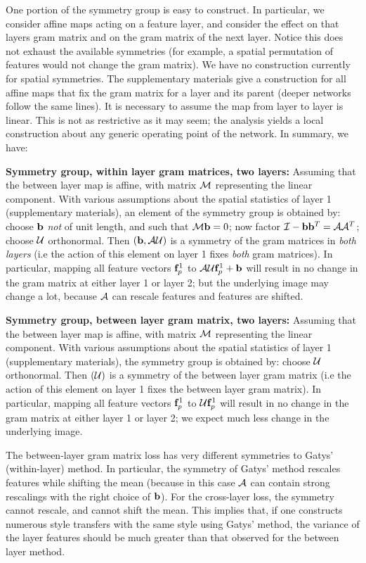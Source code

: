 \documentclass[runningheads]{llncs}
\newcommand{\vect}[1]{{\bf {#1}}}
\newcommand{\matx}[1]{{\cal {#1}}}
\begin{document}
One portion of the symmetry group is easy to construct.  In particular, we consider affine maps acting on a feature layer, and consider the effect on that layers gram matrix and
on the gram matrix of the next layer.  Notice this does not exhaust the available symmetries (for example, a spatial permutation of features
would not change the gram matrix).  We have no construction currently for spatial symmetries.
The supplementary materials give a construction for all affine maps that fix the gram matrix for a layer and its parent
(deeper networks follow the same lines).  It is necessary to assume the map from layer to layer is linear.  This is not
as restrictive as it may seem; the analysis yields a local construction about any generic operating point of the
network.  In summary, we have:

{\bf Symmetry group, within layer gram matrices, two layers:}
Assuming that the between layer map is affine, with matrix $\matx{M}$
representing the linear component.  With various assumptions about the
spatial statistics of layer 1 (supplementary materials), an element of the symmetry
group is obtained by:  choose $\vect{b}$ {\em not} of unit length, and
such that $\matx{M}\vect{b}=0$; now factor
$\matx{I}-\vect{b}\vect{b}^T=\matx{A}\matx{A}^T$; choose $\matx{U}$
orthonormal.  Then $(\vect{b}, \matx{A}\matx{U})$ is a symmetry of the
gram matrices in {\em both layers} (i.e the action of this element on
layer 1 fixes {\em both} gram matrices).   In particular, mapping all feature vectors $\vect{f}_p^1$ to
$\matx{A}\matx{U}\vect{f}_p^1+\vect{b}$ will result in no change in the gram matrix at either layer 1 or layer 2; but
the underlying image may change a lot, because $\matx{A}$ can rescale features and features are shifted.

{\bf Symmetry group, between layer gram matrix, two layers:}
Assuming that the between layer map is affine, with matrix $\matx{M}$
representing the linear component.  With various assumptions about the
spatial statistics of layer 1 (supplementary materials), the symmetry
group is obtained by:  choose $\matx{U}$
orthonormal.  Then $(\matx{U})$ is a symmetry of the between layer
gram matrix (i.e the action of this element on layer 1 fixes the
between layer gram matrix).  In particular, mapping all feature vectors $\vect{f}_p^1$ to
$\matx{U}\vect{f}_p^1$ will result in no change in the gram matrix at either layer 1 or layer 2; we expect much less
change in the underlying image.

The between-layer gram matrix loss has very different symmetries to Gatys'
(within-layer) method.  In particular, the symmetry of Gatys' method rescales
features while shifting the mean (because in this case $\matx{A}$ can contain
strong rescalings with the right choice of $\vect{b}$).   For the
cross-layer loss, the symmetry cannot rescale, and cannot shift the
mean.   This implies that, if one constructs numerous style
transfers with the same style using Gatys' method, the variance of the layer features should be much greater than that
observed for the between layer method. 
\end{document}
